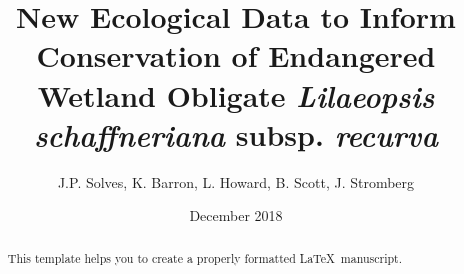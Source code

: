 \documentclass[multicol]{elsarticle}
\begin{document}
\begin{frontmatter} 
\title{New Ecological Data to Inform Conservation of Endangered Wetland Obligate \textit{Lilaeopsis schaffneriana} subsp. \textit{recurva}}
\author{J.P. Solves, K. Barron, L. Howard, B. Scott, J. Stromberg}
\address{427 E. Tyler Mall \\School of Life Sciences, Arizona State University, Tempe, Arizona}
\date{December 2018}

\begin{abstract}
This template helps you to create a properly formatted \LaTeX\ manuscript.
\end{abstract}

\begin{keyword}

\end{keyword}

\end{frontmatter}
\end{document}
